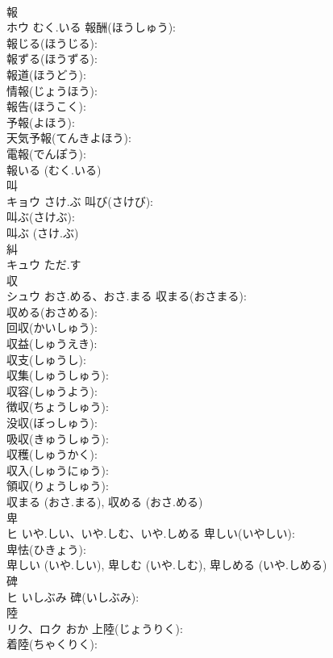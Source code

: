 \documentclass[8pt]{extreport}
\begin{document}
\begin{CJK}{UTF8}{min}
\\	報			
\\	ホウ	むく.いる	報酬(ほうしゅう): 
\\	報じる(ほうじる): 
\\	報ずる(ほうずる): 
\\	報道(ほうどう): 
\\	情報(じょうほう): 
\\	報告(ほうこく): 
\\	予報(よほう): 
\\	天気予報(てんきよほう): 
\\	電報(でんぽう): 
\\	報いる (むく.いる)
\\	叫			
\\	キョウ	さけ.ぶ	叫び(さけび): 
\\	叫ぶ(さけぶ): 
\\	叫ぶ (さけ.ぶ)
\\	糾			
\\	キュウ	ただ.す		
\\	収			
\\	シュウ	おさ.める、おさ.まる	収まる(おさまる): 
\\	収める(おさめる): 
\\	回収(かいしゅう): 
\\	収益(しゅうえき): 
\\	収支(しゅうし): 
\\	収集(しゅうしゅう): 
\\	収容(しゅうよう): 
\\	徴収(ちょうしゅう): 
\\	没収(ぼっしゅう): 
\\	吸収(きゅうしゅう): 
\\	収穫(しゅうかく): 
\\	収入(しゅうにゅう): 
\\	領収(りょうしゅう): 
\\	収まる (おさ.まる), 収める (おさ.める)
\\	卑			
\\	ヒ	いや.しい、いや.しむ、いや.しめる	卑しい(いやしい): 
\\	卑怯(ひきょう): 
\\	卑しい (いや.しい), 卑しむ (いや.しむ), 卑しめる (いや.しめる)
\\	碑			
\\	ヒ	いしぶみ	碑(いしぶみ): 
\\	陸			
\\	リク、ロク	おか	上陸(じょうりく): 
\\	着陸(ちゃくりく): 

\end{CJK}
\end{document}
